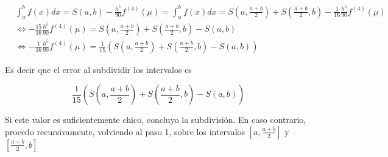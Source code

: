 \begin{align*}
&\int_{a}^b f(x) dx = S(a, b) - \frac{h^5}{90} f^{(4)}(\mu) = \int_{a}^b f(x) dx = S\left(a, \frac{a + b}{2}\right) + S\left(\frac{a + b}{2}, b\right) - \frac{1}{16}\frac{h^5}{90} f^{(4)}(\mu)\\
	&\Leftrightarrow -\frac{15}{16}\frac{h^5}{90} f^{(4)}(\mu) = S\left(a, \frac{a + b}{2}\right) + S\left(\frac{a + b}{2}, b\right) - S(a, b)\\
	&\Leftrightarrow -\frac{1}{16}\frac{h^5}{90} f^{(4)}(\mu) = \frac{1}{15}\left(S\left(a, \frac{a + b}{2}\right) + S\left(\frac{a + b}{2}, b\right) - S(a, b)\right)
\end{align*}

Es decir que el error al subdividir los intervalos es

\[\frac{1}{15}\left(S\left(a, \frac{a + b}{2}\right) + S\left(\frac{a + b}{2}, b\right) - S(a, b)\right)\]

Si este valor es suficientemente chico, concluyo la subdivisión. En caso contrario, procedo recursivamente, volviendo al paso 1, sobre los intervalos $\left[a, \frac{a + b}{2}\right]$ y $\left[\frac{a + b}{2}, b\right]$